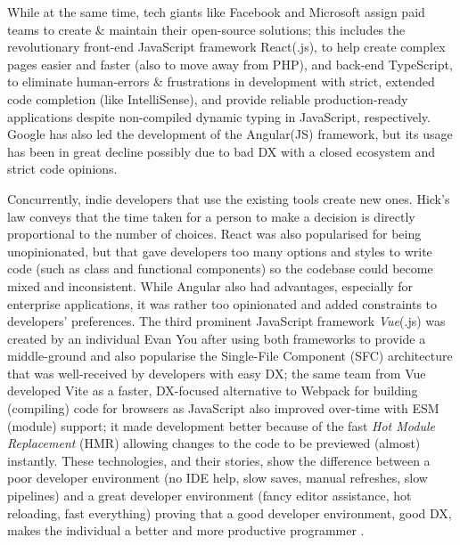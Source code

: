 While at the same time, tech giants like Facebook and Microsoft assign paid teams to create \& maintain their open-source solutions; this includes the revolutionary front-end JavaScript framework React(.js), to help create complex pages easier and faster (also to move away from PHP), and back-end TypeScript, to eliminate human-errors \& frustrations in development with strict, extended code completion (like IntelliSense), and provide reliable production-ready applications despite non-compiled dynamic typing in JavaScript, respectively. Google has also led the development of the Angular(JS) framework, but its usage has been in great decline possibly due to bad DX with a closed ecosystem and strict code opinions.

Concurrently, indie developers that use the existing tools create new ones. Hick's law conveys that the time taken for a person to make a decision is directly proportional to the number of choices. React was also popularised for being unopinionated, but that gave developers too many options and styles to write code (such as class and functional components) so the codebase could become mixed and inconsistent. While Angular also had advantages, especially for enterprise applications, it was rather too opinionated and added constraints to developers' preferences. The third prominent JavaScript framework \textit{Vue}(.js) was created by an individual Evan You after using both frameworks to provide a middle-ground and also popularise the Single-File Component (SFC) architecture that was well-received by developers with easy DX; the same team from Vue developed Vite as a faster, DX-focused alternative to Webpack for building (compiling) code for browsers as JavaScript also improved over-time with ESM (module) support; it made development better because of the fast \textit{Hot Module Replacement} (HMR) allowing changes to the code to be previewed (almost) instantly. These technologies, and their stories, show the difference between a poor developer environment (no IDE help, slow saves, manual refreshes, slow pipelines) and a great developer environment (fancy editor assistance, hot reloading, fast everything) proving that a good developer environment, good DX, makes the individual a better and more productive programmer \cite{WhatDeveloperExperience2020}.

